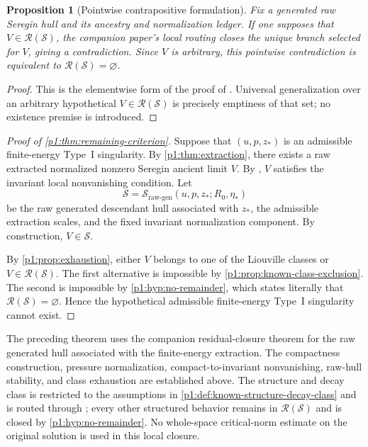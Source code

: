 \documentclass[11pt]{amsart}
\theoremstyle{plain}
\newtheorem{proposition}[proposition]{Proposition}
\theoremstyle{definition}
\theoremstyle{remark}
\numberwithin{equation}{section}
\newcommand{\calS}{\mathcal S}
\newcommand{\calR}{\mathcal R}
\begin{document}
\begin{proposition}[Pointwise contrapositive formulation]
\label{p1:prop:remainder-equivalence}
Fix a generated raw Seregin hull and its ancestry and normalization ledger.  If
one supposes that \(V\in\calR(\calS)\), the companion paper's local routing
closes the unique branch selected for \(V\), giving a contradiction.  Since
\(V\) is arbitrary, this pointwise contradiction is equivalent to
\(\calR(\calS)=\varnothing\).
\end{proposition}

\begin{proof}
This is the elementwise form of the proof of
.  Universal generalization over an arbitrary
hypothetical \(V\in\calR(\calS)\) is precisely emptiness of that set; no
existence premise is introduced.
\end{proof}

\begin{proof}[Proof of \cref{p1:thm:remaining-criterion}]
Suppose that \((u,p,z_*)\) is an admissible finite-energy Type~I singularity.
By \cref{p1:thm:extraction}, there exists a raw extracted normalized nonzero
Seregin ancient limit \(V\).  By
, \(V\) satisfies the invariant
local nonvanishing condition.  Let
\[
   \calS=\calS_{\mathrm{raw\text{-}gen}}(u,p,z_*;R_0,\eta_*)
\]
be the raw generated descendant hull associated with \(z_*\), the admissible
extraction scales, and the fixed invariant normalization component.  By
construction, \(V\in\calS\).

By \cref{p1:prop:exhaustion}, either \(V\) belongs to one of the Liouville
classes or \(V\in\calR(\calS)\).  The first alternative is impossible by
\cref{p1:prop:known-class-exclusion}.  The second is impossible by
\cref{p1:hyp:no-remainder}, which states literally that
\(\calR(\calS)=\varnothing\).  Hence the hypothetical admissible finite-energy
Type~I singularity cannot exist.
\end{proof}

The preceding theorem uses the companion residual-closure theorem for the raw
generated hull associated with the finite-energy extraction.  The compactness
construction, pressure normalization, compact-to-invariant nonvanishing,
raw-hull stability, and class exhaustion are established above.  The structure
and decay class is restricted to the assumptions in
\cref{p1:def:known-structure-decay-class} and is routed through
; every other structured behavior remains
in \(\calR(\calS)\) and is closed by \cref{p1:hyp:no-remainder}.  No
whole-space critical-norm estimate on the original solution is used in this
local closure.
\end{document}
